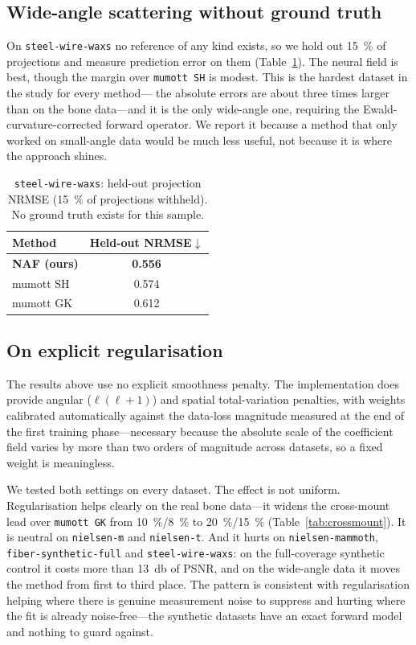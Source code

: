 \documentclass[11pt,a4paper]{article}
\begin{document}
\subsection{Wide-angle scattering without ground truth}

On \texttt{steel-wire-waxs} no reference of any kind exists, so we hold out
\SI{15}{\percent} of projections and measure prediction error on them
(Table~\ref{tab:steelwire}). The neural field is best, though the margin over
\texttt{mumott SH} is modest. This is the hardest dataset in the study for every method---
the absolute errors are about three times larger than on the bone data---and it is the
only wide-angle one, requiring the Ewald-curvature-corrected forward operator. We report it
because a method that only worked on small-angle data would be much less useful, not
because it is where the approach shines.

\begin{table}[t]
\centering
\small
\caption{\texttt{steel-wire-waxs}: held-out projection NRMSE (\SI{15}{\percent} of
projections withheld). No ground truth exists for this sample.}
\label{tab:steelwire}
\begin{tabular}{@{}lc@{}}
\toprule
Method & Held-out NRMSE$\downarrow$ \\
\midrule
\textbf{NAF (ours)} & \textbf{0.556} \\
mumott SH           & 0.574 \\
mumott GK           & 0.612 \\
\bottomrule
\end{tabular}
\end{table}

\subsection{On explicit regularisation}
\label{sec:regularisation}

The results above use no explicit smoothness penalty. The implementation does provide
angular ($\ell(\ell+1)$) and spatial total-variation penalties, with weights calibrated
automatically against the data-loss magnitude measured at the end of the first training
phase---necessary because the absolute scale of the coefficient field varies by more than
two orders of magnitude across datasets, so a fixed weight is meaningless.

We tested both settings on every dataset. The effect is not uniform. Regularisation helps
clearly on the real bone data---it widens the cross-mount lead over \texttt{mumott GK} from
\SI{10}{\percent}/\SI{8}{\percent} to \SI{20}{\percent}/\SI{15}{\percent}
(Table~\ref{tab:crossmount}). It is neutral on \texttt{nielsen-m} and \texttt{nielsen-t}. And it
hurts on \texttt{nielsen-mammoth}, \texttt{fiber-synthetic-full} and
\texttt{steel-wire-waxs}: on the full-coverage synthetic control it costs more than
\SI{13}{\decibel} of PSNR, and on the wide-angle data it moves the method from first to
third place. The pattern is consistent with regularisation helping where there is genuine
measurement noise to suppress and hurting where the fit is already noise-free---the
synthetic datasets have an exact forward model and nothing to guard against.
\end{document}
